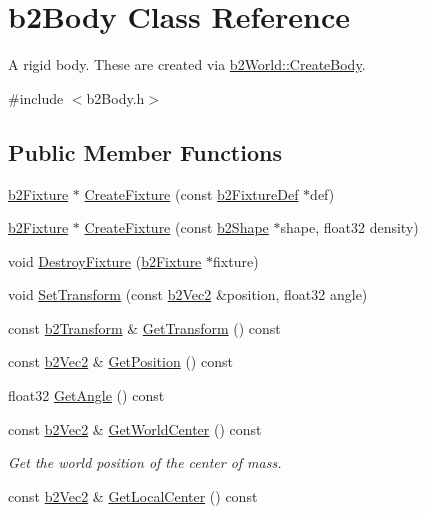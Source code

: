 \hypertarget{classb2_body}{}\section{b2\+Body Class Reference}
\label{classb2_body}


A rigid body. These are created via \hyperlink{classb2_world_a9323d553e4c132b26d8741b457d7c034}{b2\+World\+::\+Create\+Body}.  




{\ttfamily \#include $<$b2\+Body.\+h$>$}

\subsection*{Public Member Functions}
\begin{DoxyCompactItemize}
\item 
\hyperlink{classb2_fixture}{b2\+Fixture} $\ast$ \hyperlink{classb2_body_a40dda91b34418bb40e31e2db9b1b76a5}{Create\+Fixture} (const \hyperlink{structb2_fixture_def}{b2\+Fixture\+Def} $\ast$def)
\item 
\hyperlink{classb2_fixture}{b2\+Fixture} $\ast$ \hyperlink{classb2_body_a9bdbbc58d1cc51aec51a978174a2ba48}{Create\+Fixture} (const \hyperlink{classb2_shape}{b2\+Shape} $\ast$shape, float32 density)
\item 
void \hyperlink{classb2_body_a856d1df86b7bded91f02d8cfcaea1c2f}{Destroy\+Fixture} (\hyperlink{classb2_fixture}{b2\+Fixture} $\ast$fixture)
\item 
void \hyperlink{classb2_body_a4686f32bbce5723761e9719c706eca11}{Set\+Transform} (const \hyperlink{structb2_vec2}{b2\+Vec2} \&position, float32 angle)
\item 
const \hyperlink{structb2_transform}{b2\+Transform} \& \hyperlink{classb2_body_adaaebca750d0bda56a543884adc5f519}{Get\+Transform} () const 
\item 
const \hyperlink{structb2_vec2}{b2\+Vec2} \& \hyperlink{classb2_body_a798da9dc2d47431912d991d152b13711}{Get\+Position} () const 
\item 
float32 \hyperlink{classb2_body_a57c4a1946a6dd5a00e28691bc419fdcd}{Get\+Angle} () const 
\item 
const \hyperlink{structb2_vec2}{b2\+Vec2} \& \hyperlink{classb2_body_a04db0c7b12b315802e58b33884f4f63c}{Get\+World\+Center} () const \hypertarget{classb2_body_a04db0c7b12b315802e58b33884f4f63c}{}\label{classb2_body_a04db0c7b12b315802e58b33884f4f63c}

\begin{DoxyCompactList}\small\item\em Get the world position of the center of mass. \end{DoxyCompactList}\item 
const \hyperlink{structb2_vec2}{b2\+Vec2} \& \hyperlink{classb2_body_a27ed7f8a3b36ddfb01069ee8f7106033}{Get\+Local\+Center} () const \hypertarget{classb2_body_a27ed7f8a3b36ddfb01069ee8f7106033}{}\label{classb2_body_a27ed7f8a3b36ddfb01069ee8f7106033}


\end{DoxyCompactItemize}
